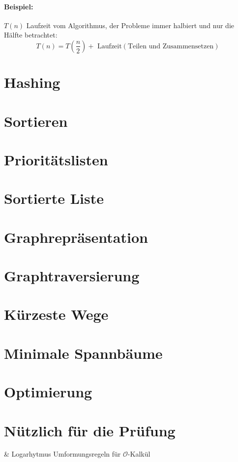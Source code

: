 \documentclass[a4paper]{scrartcl}
\begin{document}
		\paragraph{Beispiel:}
		\( T(n) \) Laufzeit vom Algorithmus, der Probleme immer halbiert und nur die Hälfte betrachtet:
		\[ T(n) = T(\frac{n}{2}) + \text{ Laufzeit} (\text{Teilen und Zusammensetzen}) \]
		
		\subsection{}
		\subsection{}
	
		
\section[Chaos als Ordnungsprinzip]{Hashing}
\section[Effizienz durch Ordnung]{Sortieren}
\section[Immer die Übersicht behalten]{Prioritätslisten}
\section[Die eierlegende Wollmilchsau]{Sortierte Liste}
\section[Beziehungen im Griff haben]{Graphrepräsentation}
\section[Globalen Dingen auf der Spur]{Graphtraversierung}
\section[Schnellstens zum Ziel]{Kürzeste Wege}
\section[Immer gut verbunden]{Minimale Spannbäume}
\section[Noch mehr Entwurfsmethoden]{Optimierung}
\section{Nützlich für die Prüfung}
	\begin{easylist}
		& Logarhytmus Umformungsregeln für \(\mathcal{O}\)-Kalkül
	\end{easylist}
\end{document}
